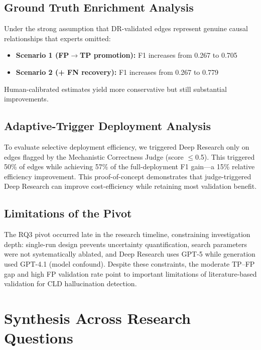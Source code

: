 \subsection{Ground Truth Enrichment Analysis}

Under the strong assumption that DR-validated edges represent genuine causal relationships that experts omitted:
\begin{itemize}[noitemsep]
    \item \textbf{Scenario 1 (FP$\rightarrow$TP promotion):} F1 increases from 0.267 to 0.705
    \item \textbf{Scenario 2 (+ FN recovery):} F1 increases from 0.267 to 0.779
\end{itemize}
Human-calibrated estimates yield more conservative but still substantial improvements.

\subsection{Adaptive-Trigger Deployment Analysis}

To evaluate selective deployment efficiency, we triggered Deep Research only on edges flagged by the Mechanistic Correctness Judge (score $\leq$0.5). This triggered 50\% of edges while achieving 57\% of the full-deployment F1 gain---a 15\% relative efficiency improvement. This proof-of-concept demonstrates that judge-triggered Deep Research can improve cost-efficiency while retaining most validation benefit.

\subsection{Limitations of the Pivot}

The RQ3 pivot occurred late in the research timeline, constraining investigation depth: single-run design prevents uncertainty quantification, search parameters were not systematically ablated, and Deep Research uses GPT-5 while generation used GPT-4.1 (model confound). Despite these constraints, the moderate TP--FP gap and high FP validation rate point to important limitations of literature-based validation for CLD hallucination detection.

\section{Synthesis Across Research Questions}
\label{sec:discussion_synthesis}

